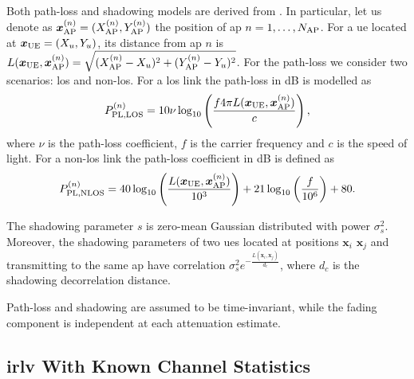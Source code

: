 \documentclass[draftcls,onecolumn,12pt]{IEEEtran}
\begin{document}
Both path-loss and shadowing models are  derived from \cite{3gpp}. In particular, let us denote as $\bm{x}_{\rm AP}^{(n)} =(X_{\rm AP}^{(n)},Y_{\rm AP}^{(n)})$ the position of  \ac{ap} $n= 1, \ldots, N_{\rm AP}$. For a \ac{ue} located at $\bm{x}_{\rm UE}=(X_u,Y_u)$, its distance from \ac{ap} $n$ is $L(\bm{x}_{\rm UE},\bm{x}_{\rm AP}^{(n)}) = \sqrt{(X_{\rm AP}^{(n)}-X_u)^2+(Y_{\rm AP}^{(n)}-Y_u)^2}$. For the path-loss we consider two scenarios: \ac{los} and non-\ac{los}. For a \ac{los} link the path-loss in dB is modelled as
\begin{equation}\label{eq:los}
    P_{{\rm PL},{\rm LOS}}^{(n)} = 10 \nu \log_{10}\left(\frac{f 4\pi L(\bm{x}_{\rm UE},\bm{x}_{\rm AP}^{(n)})}{c}\right),
\end{equation}
where $\nu$ is the path-loss coefficient, $f$ is the carrier frequency and $c$ is the speed of light. 
For a  non-\ac{los} link the path-loss coefficient in dB is defined as
\begin{equation}
    P_{{\rm PL}, {\rm NLOS}}^{(n)} = 40\log_{10}\left (\frac{L(\bm{x}_{\rm UE},\bm{x}_{\rm AP}^{(n)})}{10^3}\right ) + 21\log_{10}\left(\frac{f}{10^6}\right) + 80.
\end{equation}

The shadowing parameter $s$ is zero-mean Gaussian distributed with power $\sigma^2_s$. Moreover, the shadowing parameters of two \acp{ue} located at positions $\bm{x}_i$ $\bm{x}_j$ and transmitting to the same \ac{ap} have correlation $\sigma_s^2e^{-\frac{L(\bm{x}_i,\bm{x}_j)}{d_c}}$, where $d_c$ is the shadowing decorrelation distance. 

Path-loss and shadowing are assumed to be time-invariant, while the fading component is independent at each attenuation estimate. 

\subsection{\ac{irlv} With Known Channel Statistics}\label{sec:auth}
\end{document}
